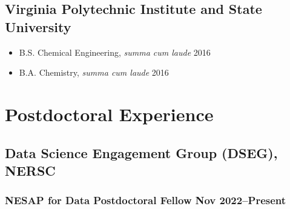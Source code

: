 \documentclass[11pt]{article} %
\begin{document}
\subsection{Virginia Polytechnic Institute and State University }
\begin{itemize}
  \item B.S. Chemical Engineering, \textit{summa cum laude} \hfill 2016
  \item B.A. Chemistry, \textit{summa cum laude} \hfill 2016
\end{itemize}

\section{Postdoctoral Experience}

\subsection{Data Science Engagement Group (DSEG), NERSC}

\subsubsection{NESAP for Data Postdoctoral Fellow \hfill Nov 2022--Present}
\end{document}
